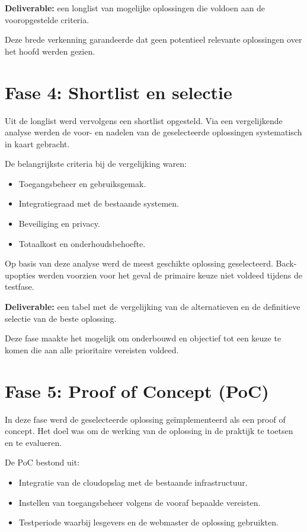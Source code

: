 \textbf{Deliverable:} een longlist van mogelijke oplossingen die voldoen aan de vooropgestelde criteria.

Deze brede verkenning garandeerde dat geen potentieel relevante oplossingen over het hoofd werden gezien.

\section{Fase 4: Shortlist en selectie}
Uit de longlist werd vervolgens een shortlist opgesteld. Via een vergelijkende analyse werden de voor- en nadelen van de geselecteerde oplossingen systematisch in kaart gebracht.

De belangrijkste criteria bij de vergelijking waren:
\begin{itemize}
    \item Toegangsbeheer en gebruiksgemak.
    \item Integratiegraad met de bestaande systemen.
    \item Beveiliging en privacy.
    \item Totaalkost en onderhoudsbehoefte.
\end{itemize}

Op basis van deze analyse werd de meest geschikte oplossing geselecteerd. Back-upopties werden voorzien voor het geval de primaire keuze niet voldeed tijdens de testfase.

\textbf{Deliverable:} een tabel met de vergelijking van de alternatieven en de definitieve selectie van de beste oplossing.

Deze fase maakte het mogelijk om onderbouwd en objectief tot een keuze te komen die aan alle prioritaire vereisten voldeed.

\section{Fase 5: Proof of Concept (PoC)}
In deze fase werd de geselecteerde oplossing geïmplementeerd als een proof of concept. Het doel was om de werking van de oplossing in de praktijk te toetsen en te evalueren.

De PoC bestond uit:
\begin{itemize}
    \item Integratie van de cloudopslag met de bestaande infrastructuur.
    \item Instellen van toegangsbeheer volgens de vooraf bepaalde vereisten.
    \item Testperiode waarbij lesgevers en de webmaster de oplossing gebruikten.
\end{itemize}

